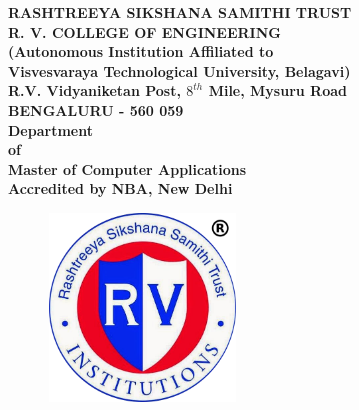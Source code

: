 \documentclass[12pt,a4paper]{article}
\title{\ttitle} %
\begin{document}
 
\begin{titlepage}
		
	\begin{center}
		\textbf{\large{RASHTREEYA SIKSHANA SAMITHI TRUST}}\\
		\textbf{\LARGE{R. V. COLLEGE OF ENGINEERING}}\\
\textbf{\large{(Autonomous Institution Affiliated to}}\\
\textbf{\large{Visvesvaraya Technological University, Belagavi)}}\\
\textbf{\large{R.V. Vidyaniketan Post, $8^{th}$ Mile, Mysuru Road}}\\
\textbf{\large{BENGALURU - 560 059}}\\\vspace{1cm}
\textbf{\LARGE{\textcolor{NavyBlue}{Department}}}\\
\textbf{\LARGE{\textcolor{NavyBlue}{of}}}\\
	\textbf{\LARGE{\textcolor{NavyBlue}{Master of Computer Applications}}}
	\\\vspace{0.25cm}
	\textbf{\large{Accredited by NBA, New Delhi}}
	\end{center} 
	\begin{center}
   	 \begin{figure}[h]
	\centering
		\includegraphics[height=5cm, width=5cm]{RVCE.png}
\end{figure}\vspace{-0.3cm}


\end{center}
\end{titlepage}
\end{document}

